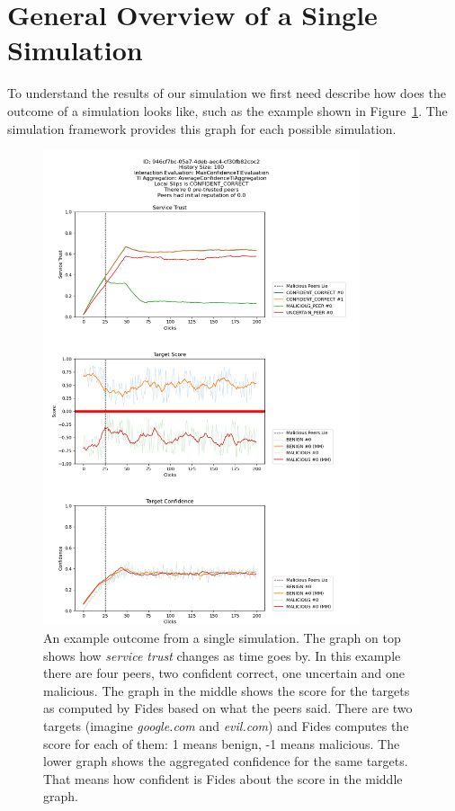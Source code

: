 \section{General Overview of a Single Simulation}
\label{sec:general-overview-of-simulation-output}
To understand the results of our simulation we first need describe how does the outcome of a simulation looks like, such as the example shown in Figure~\ref{fig:single-simulation-example}.
The simulation framework provides this graph for each possible simulation.

\begin{figure}
    \centering
    \includegraphics[width=0.83\textwidth]{assets/example_evaluation.png}
    \caption{An example outcome from a single simulation. The graph on top shows how \textit{service trust} changes as time goes by. In this example there are four peers, two confident correct, one uncertain and one malicious. The graph in the middle shows the score for the targets as computed by Fides based on what the peers said. There are two targets (imagine \textit{google.com} and \textit{evil.com}) and Fides computes the score for each of them: 1 means benign, -1 means malicious. The lower graph shows the aggregated confidence for the same targets. That means how confident is Fides about the score in the middle graph.}
    \label{fig:single-simulation-example}
\end{figure}

